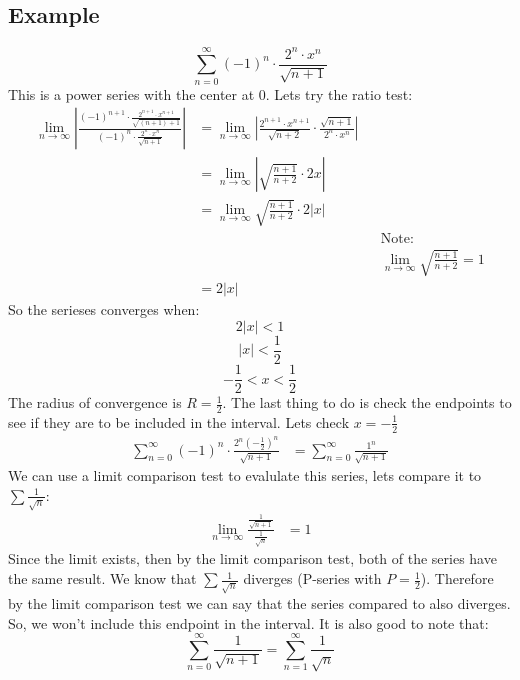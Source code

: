 \documentclass{report}
\begin{document}
    \subsection{Example}
        \[\sum_{n=0}^{\infty} (-1)^n \cdot \frac{2^n \cdot x^n}{\sqrt{n+1}}\]
        This is a power series with the center at \(0\).
        Lets try the ratio test:
        \begin{align*}
            \lim_{n \to \infty} \left| \frac{(-1)^{n+1} \cdot \frac{2^{n+1} \cdot x^{n+1}}{\sqrt{(n+1)+1}}}{(-1)^n \cdot \frac{2^n \cdot x^n}{\sqrt{n+1}}} \right|
            &= \lim_{n \to \infty} \left| \frac{2^{n+1} \cdot x^{n+1}}{\sqrt{n+2}} \cdot \frac{\sqrt{n+1}}{2^n \cdot x^n} \right| \\
            &= \lim_{n \to \infty} \left| \sqrt{\frac{n+1}{n+2}} \cdot 2x \right| \\
            &= \lim_{n \to \infty}  \sqrt{\frac{n+1}{n+2}} \cdot 2 |x| \\
            && &\text{Note:} \\
            && &\lim_{n \to \infty}  \sqrt{\frac{n+1}{n+2}} = 1 \\
            &=2|x|
        \end{align*}
        So the serieses converges when:
        \[2|x| < 1\]
        \[|x| < \frac{1}{2}\]
        \[- \frac{1}{2} < x < \frac{1}{2}\]
        The radius of convergence is \(R = \frac{1}{2}\).
        The last thing to do is check the endpoints to see if they are to be included in the interval.
        Lets check \(x = - \frac{1}{2}\)
        \begin{align*}
            \sum_{n=0}^{\infty} (-1)^n \cdot \frac{2^n(- \frac{1}{2})^n}{\sqrt{n+1}}
            &= \sum_{n=0}^{\infty} \frac{1^n}{\sqrt{n+1}}
        \end{align*}
        We can use a limit comparison test to evalulate this series, lets compare it to \(\sum \frac{1}{\sqrt{n}}\):
        \begin{align*}
            \lim_{n \to \infty} \frac{\frac{1}{\sqrt{n+1}}}{\frac{1}{\sqrt{n}}}
            &= 1
        \end{align*}
        Since the limit exists, then by the limit comparison test, both of the series have the same result.
        We know that \(\sum \frac{1}{\sqrt{n}}\) diverges (P-series with \(P = \frac{1}{2}\)).
        Therefore by the limit comparison test we can say that the series compared to also diverges.
        So, we won't include this endpoint in the interval.
        It is also good to note that:
        \[\sum_{n=0}^{\infty} \frac{1}{\sqrt{n+1}} = \sum_{n = 1}^{\infty} \frac{1}{\sqrt{n}}\]
\end{document}
